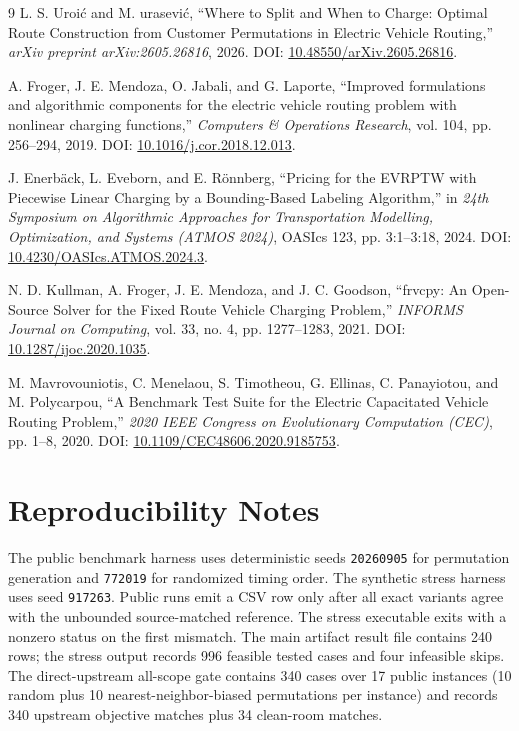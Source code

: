 \documentclass[11pt]{article}
\begin{document}
\begin{thebibliography}{9}
L. S. Uroi\'c and M. \DJ urasevi\'c,
``Where to Split and When to Charge: Optimal Route Construction from Customer Permutations in Electric Vehicle Routing,''
\emph{arXiv preprint arXiv:2605.26816}, 2026. DOI: \href{https://doi.org/10.48550/arXiv.2605.26816}{10.48550/arXiv.2605.26816}.

A. Froger, J. E. Mendoza, O. Jabali, and G. Laporte,
``Improved formulations and algorithmic components for the electric vehicle routing problem with nonlinear charging functions,''
\emph{Computers \& Operations Research}, vol. 104, pp. 256--294, 2019. DOI: \href{https://doi.org/10.1016/j.cor.2018.12.013}{10.1016/j.cor.2018.12.013}.

J. Enerb\"ack, L. Eveborn, and E. R\"onnberg,
``Pricing for the EVRPTW with Piecewise Linear Charging by a Bounding-Based Labeling Algorithm,''
in \emph{24th Symposium on Algorithmic Approaches for Transportation Modelling, Optimization, and Systems (ATMOS 2024)}, OASIcs 123, pp. 3:1--3:18, 2024. DOI: \href{https://doi.org/10.4230/OASIcs.ATMOS.2024.3}{10.4230/OASIcs.ATMOS.2024.3}.

N. D. Kullman, A. Froger, J. E. Mendoza, and J. C. Goodson,
``frvcpy: An Open-Source Solver for the Fixed Route Vehicle Charging Problem,''
\emph{INFORMS Journal on Computing}, vol. 33, no. 4, pp. 1277--1283, 2021. DOI: \href{https://doi.org/10.1287/ijoc.2020.1035}{10.1287/ijoc.2020.1035}.

M. Mavrovouniotis, C. Menelaou, S. Timotheou, G. Ellinas, C. Panayiotou, and M. Polycarpou,
``A Benchmark Test Suite for the Electric Capacitated Vehicle Routing Problem,''
\emph{2020 IEEE Congress on Evolutionary Computation (CEC)}, pp. 1--8, 2020. DOI: \href{https://doi.org/10.1109/CEC48606.2020.9185753}{10.1109/CEC48606.2020.9185753}.
\end{thebibliography}

\appendix
\section{Reproducibility Notes}
\small
The public benchmark harness uses deterministic seeds \texttt{20260905} for permutation generation and \texttt{772019} for randomized timing order. The synthetic stress harness uses seed \texttt{917263}. Public runs emit a CSV row only after all exact variants agree with the unbounded source-matched reference. The stress executable exits with a nonzero status on the first mismatch. The main artifact result file contains 240 rows; the stress output records 996 feasible tested cases and four infeasible skips. The direct-upstream all-scope gate contains 340 cases over 17 public instances (10 random plus 10 nearest-neighbor-biased permutations per instance) and records 340 upstream objective matches plus 34 clean-room matches.
\end{document}
